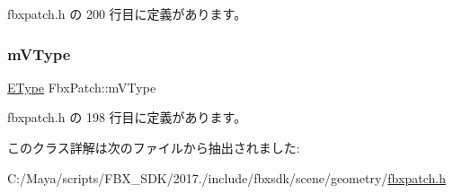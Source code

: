  fbxpatch.\+h の 200 行目に定義があります。

\mbox{\label{class_fbx_patch_aa0e38cb994ef8741fbb163ca587cb2d6}} 
\subsubsection{\texorpdfstring{m\+V\+Type}{mVType}}
{\footnotesize\ttfamily \hyperlink{class_fbx_patch_ad669936e6b844a7a15fa30ec7c183fbb}{E\+Type} Fbx\+Patch\+::m\+V\+Type\hspace{0.3cm}{\ttfamily [protected]}}



 fbxpatch.\+h の 198 行目に定義があります。



このクラス詳解は次のファイルから抽出されました\+:\begin{DoxyCompactItemize}
\item 
C\+:/\+Maya/scripts/\+F\+B\+X\+\_\+\+S\+D\+K/2017./include/fbxsdk/scene/geometry/\hyperlink{fbxpatch_8h}{fbxpatch.\+h}\end{DoxyCompactItemize}
